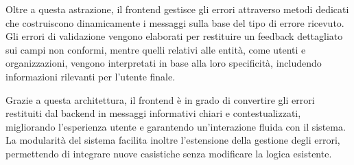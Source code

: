 Oltre a questa astrazione, il frontend gestisce gli errori attraverso metodi dedicati che costruiscono dinamicamente i messaggi sulla base del tipo di errore ricevuto. Gli errori di validazione vengono elaborati per restituire un feedback dettagliato sui campi non conformi, mentre quelli relativi alle entità, come utenti e organizzazioni, vengono interpretati in base alla loro specificità, includendo informazioni rilevanti per l’utente finale.

Grazie a questa architettura, il frontend è in grado di convertire gli errori restituiti dal backend in messaggi informativi chiari e contestualizzati, migliorando l’esperienza utente e garantendo un’interazione fluida con il sistema. La modularità del sistema facilita inoltre l’estensione della gestione degli errori, permettendo di integrare nuove casistiche senza modificare la logica esistente.
